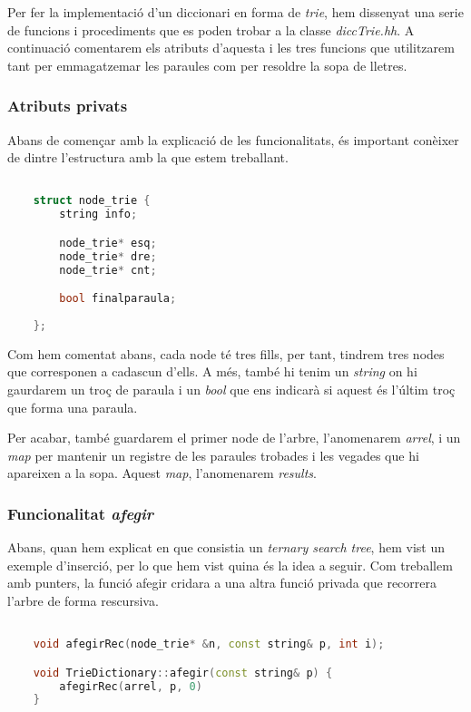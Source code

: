 \documentclass[titlepage]{article}
\begin{document}
Per fer la implementació d'un diccionari en forma de \textit{trie}, hem dissenyat una serie de funcions i procediments que es poden trobar a la classe \textit{diccTrie.hh}. A continuació comentarem els atributs d'aquesta i les tres funcions que utilitzarem tant per emmagatzemar les paraules com per resoldre la sopa de lletres.

\subsubsection{Atributs privats}

Abans de començar amb la explicació de les funcionalitats, és important conèixer de dintre l'estructura amb la que estem treballant.

\begin{lstlisting}[language=C++]

    struct node_trie {
        string info;

        node_trie* esq;
        node_trie* dre;
        node_trie* cnt;

        bool finalparaula;
        
    };
\end{lstlisting}

Com hem comentat abans, cada node té tres fills, per tant, tindrem tres nodes que corresponen a cadascun d'ells. A més, també hi tenim un \textit{string} on hi gaurdarem un troç de paraula i un \textit{bool} que ens indicarà si aquest és l'últim troç que forma una paraula. 
\newline\par
Per acabar, també guardarem el primer node de l'arbre, l'anomenarem \textit{arrel}, i un \textit{map} per mantenir un registre de les paraules trobades i les vegades que hi apareixen a la sopa. Aquest \textit{map}, l'anomenarem \textit{results}.

\subsubsection{Funcionalitat \textit{afegir}}

Abans, quan hem explicat en que consistia un \textit{ternary search tree}, hem vist un exemple d'inserció, per lo que hem vist quina és la idea a seguir. Com treballem amb punters, la funció afegir cridara a una altra funció privada que recorrera l'arbre de forma rescursiva.

\begin{lstlisting}[language=C++]

    void afegirRec(node_trie* &n, const string& p, int i); 

    void TrieDictionary::afegir(const string& p) {
        afegirRec(arrel, p, 0)
    }
\end{lstlisting}
\end{document}
